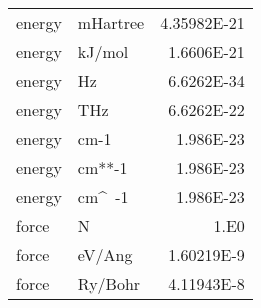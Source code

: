 \documentclass[11pt]{article}
\begin{document}
\begin{center}
\begin{tabular}{llr}
energy   & mHartree   & 4.35982E-21 \\
energy   & kJ/mol     & 1.6606E-21 \\
energy   & Hz         & 6.6262E-34 \\
energy   & THz        & 6.6262E-22 \\
energy   & cm-1       & 1.986E-23 \\
energy   & cm**-1     & 1.986E-23 \\
energy   & cm\^~-1      & 1.986E-23 \\
force    & N          & 1.E0 \\
force    & eV/Ang     & 1.60219E-9 \\
force    & Ry/Bohr    & 4.11943E-8 \\
\hline
\end{tabular}


\end{center}
\end{document}
